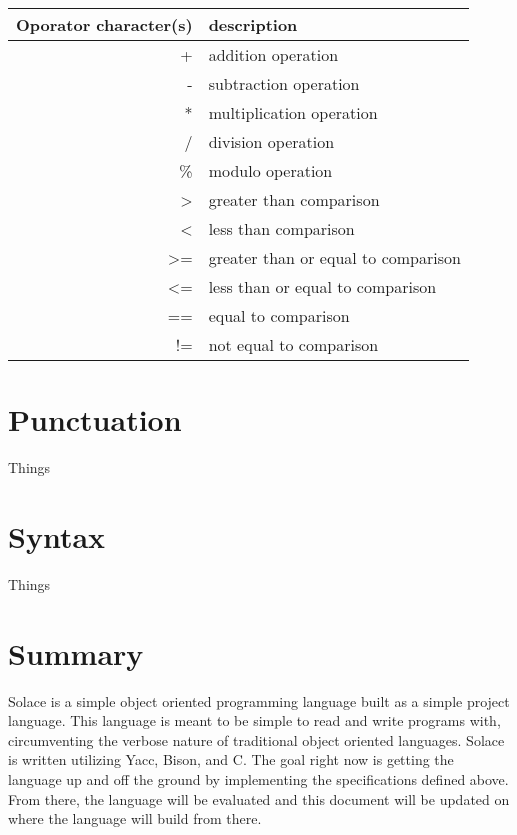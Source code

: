 \documentclass{article}
\begin{document}
\begin{tabular}{r|l}
Oporator character(s) & description \\
\hline
\hline
+ & addition operation \\
- & subtraction operation \\
* & multiplication operation \\
/ & division operation \\
\% & modulo operation \\
> & greater than comparison \\
< & less than comparison \\
>= & greater than or equal to comparison \\
<= & less than or equal to comparison \\
== & equal to comparison \\
!= & not equal to comparison \\
\hline
\end{tabular}

\section{Punctuation}
Things


\section{Syntax}
Things


\section{Summary}
Solace is a simple object oriented programming language built as a simple project language.
This language is meant to be simple to read and write programs with, circumventing the verbose
nature of traditional object oriented languages. Solace is written utilizing Yacc, Bison, and C.
The goal right now is getting the language up and off the ground by implementing the specifications
defined above. From there, the language will be evaluated and this document will be updated on
where the language will build from there.
\end{document}
